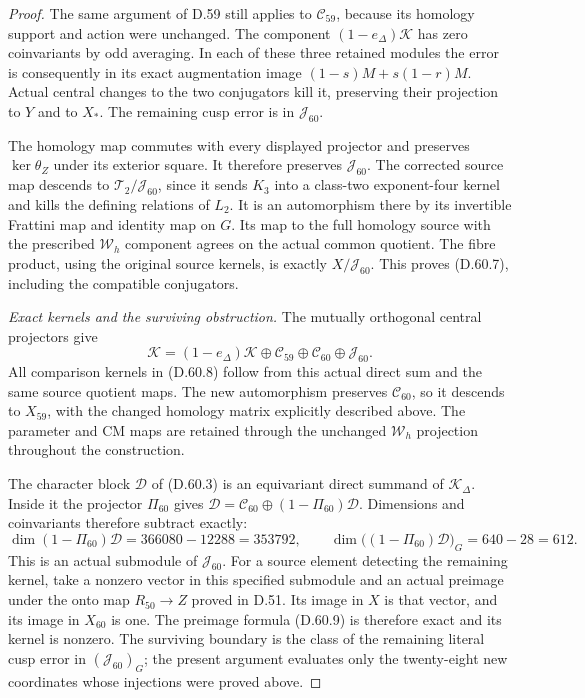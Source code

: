 \begin{proof}
The same argument of D.59
still applies to \(\mathcal C_{59}\),
because its homology support
and action were unchanged.
The component
\((1-e_\Delta)\mathcal K\)
has zero coinvariants by
odd averaging. In each of
these three retained modules
the error is consequently in
its exact augmentation image
\((1-s)M+s(1-r)M\).
Actual central changes to
the two conjugators kill it,
preserving their projection
to \(Y\) and to \(X_*\).
The remaining cusp error is
in \(\mathcal J_{60}\).

The homology map commutes
with every displayed projector
and preserves \(\ker\theta_Z\)
under its exterior square.
It therefore preserves
\(\mathcal J_{60}\).
The corrected source map
descends to
\(\mathcal T_2/\mathcal J_{60}\),
since it sends \(K_3\) into
a class-two exponent-four
kernel and kills the defining
relations of \(L_2\).
It is an automorphism there
by its invertible Frattini map
and identity map on \(G\).
Its map to the full homology
source with the prescribed
\(\mathcal W_h\) component
agrees on the actual common
quotient. The fibre product,
using the original source
kernels, is exactly
\(X/\mathcal J_{60}\).
This proves (D.60.7), including
the compatible conjugators.

\emph{Exact kernels and the surviving obstruction.}
The mutually orthogonal
central projectors give
\[
 \mathcal K=(1-e_\Delta)\mathcal K
       \oplus\mathcal C_{59}
       \oplus\mathcal C_{60}
       \oplus\mathcal J_{60}.
 \tag{D.60.24}
\]
All comparison kernels in
(D.60.8) follow from this
actual direct sum and the
same source quotient maps.
The new automorphism preserves
\(\mathcal C_{60}\), so it
descends to \(X_{59}\), with
the changed homology matrix
explicitly described above.
The parameter and CM maps
are retained through the
unchanged \(\mathcal W_h\)
projection throughout the
construction.

The character block
\(\mathcal D\) of (D.60.3)
is an equivariant direct
summand of \(\mathcal K_\Delta\).
Inside it the projector
\(\Pi_{60}\) gives
\(\mathcal D=\mathcal C_{60}
\oplus(1-\Pi_{60})\mathcal D\).
Dimensions and coinvariants
therefore subtract exactly:
\[
 \dim(1-\Pi_{60})\mathcal D=366080-12288=353792,
 \qquad
 \dim\bigl((1-\Pi_{60})\mathcal D\bigr)_G=640-28=612.
 \tag{D.60.25}
\]
This is an actual submodule
of \(\mathcal J_{60}\).
For a source element detecting
the remaining kernel, take
a nonzero vector in this
specified submodule and an
actual preimage under the
onto map \(R_{50}\to Z\)
proved in D.51. Its image
in \(X\) is that vector,
and its image in \(X_{60}\)
is one. The preimage formula
(D.60.9) is therefore exact
and its kernel is nonzero.
The surviving boundary is
the class of the remaining
literal cusp error in
\((\mathcal J_{60})_G\);
the present argument evaluates
only the twenty-eight new
coordinates whose injections
were proved above.
\end{proof}
